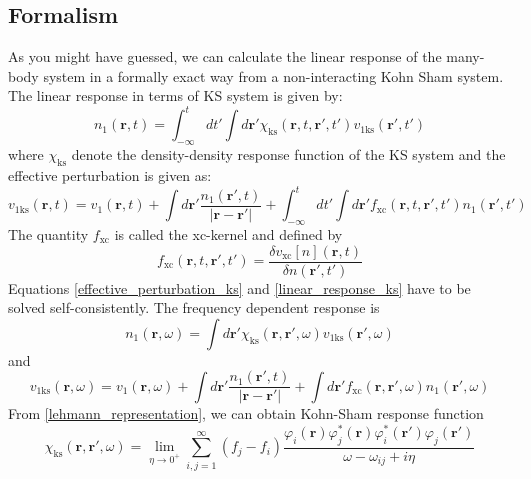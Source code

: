 \subsection{Formalism}
As you might have guessed, we can calculate the linear response of the many-body system in a formally exact way from a non-interacting Kohn Sham system. The linear response in terms of KS system is given by:
\begin{equation}\label{linear_response_ks}
    n_1(\mathbf{r},t) = \int_{-\infty}^tdt'\int d\mathbf{r}'\chi_{\text{ks}}(\mathbf{r},t,\mathbf{r}',t')v_{1\text{ks}}(\mathbf{r}',t')
\end{equation}
where $\chi_{\text{ks}}$ denote the density-density response function of the KS system and the effective perturbation is given as:
\begin{equation}\label{effective_perturbation_ks}
    v_{1\text{ks}}(\mathbf{r},t) = v_1(\mathbf{r},t) + \int d\mathbf{r}'\frac{n_1(\mathbf{r}',t)}{|\mathbf{r}-\mathbf{r}'|} +   \int_{-\infty}^tdt'\int d\mathbf{r}'f_{\text{xc}}(\mathbf{r},t,\mathbf{r}',t')n_1(\mathbf{r}',t')
\end{equation}
The quantity $f_{\text{xc}}$ is called the xc-kernel and defined by
\begin{equation}
    f_{\text{xc}}(\mathbf{r},t,\mathbf{r}',t') = \frac{\delta v_{\text{xc}}[n](\mathbf{r},t)}{\delta n(\mathbf{r}',t')}
\end{equation}
Equations \eqref{effective_perturbation_ks} and \eqref{linear_response_ks} have to be solved self-consistently. The frequency dependent response is
\begin{equation}
    n_1(\mathbf{r},\omega) = \int d\mathbf{r'} \chi_{\text{ks}}(\mathbf{r},\mathbf{r}',\omega)v_{1\text{ks}}(\mathbf{r}',\omega) 
\end{equation}
and 
\begin{equation}
    v_{1\text{ks}}(\mathbf{r},\omega) = v_1(\mathbf{r},\omega) + \int d\mathbf{r}'\frac{n_1(\mathbf{r}',t)}{|\mathbf{r}-\mathbf{r}'|} +   \int d\mathbf{r}'f_{\text{xc}}(\mathbf{r},\mathbf{r}',\omega)n_1(\mathbf{r}',\omega)
\end{equation}
From \eqref{lehmann_representation}, we can obtain Kohn-Sham response function
\begin{equation}
    \chi_{\text{ks}}(\mathbf{r},\mathbf{r}',\omega) = \lim_{\eta \to 0^+} \sum_{i,j = 1}^\infty(f_j - f_i)\frac{\varphi_i(\mathbf{r})\varphi_j^*(\mathbf{r})\varphi_i^*(\mathbf{r}')\varphi_j(\mathbf{r}')
    }{\omega - \omega_{ij} + i\eta}
\end{equation}
